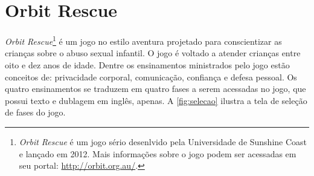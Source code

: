 



\section{Orbit Rescue}\label{sssec:Orbit}


\textit{Orbit Rescue}\footnote{\textit{Orbit Rescue} é um jogo sério desenlvido pela Universidade de Sunshine Coast e lançado em 2012. Mais informações sobre o jogo podem ser acessadas em seu portal: \url{http://orbit.org.au/}.} é um jogo no estilo aventura projetado para conscientizar as crianças sobre o abuso sexual infantil. O jogo é voltado a atender crianças entre oito e dez anos de idade. Dentre os ensinamentos ministrados pelo jogo estão conceitos de: privacidade corporal, comunicação, confiança e defesa pessoal. Os quatro ensinamentos se traduzem em quatro fases a serem acessadas no jogo, que possui texto e dublagem em inglês, apenas. A \autoref{fig:selecao} ilustra a tela de seleção de fases do jogo.

